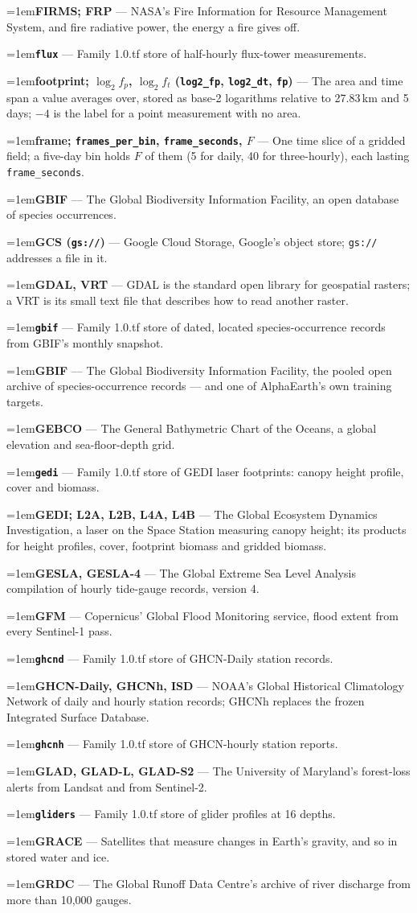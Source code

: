 \documentclass[10pt]{article}
\newcommand{\code}[1]{\texttt{#1}}
\newcommand{\gl}[2]{\par\hangindent=1em\hangafter=1\textbf{#1} --- #2\par}
\begin{document}
\gl{FIRMS; FRP}{NASA's Fire Information for Resource Management System, and fire radiative power, the energy a fire gives off.}
\gl{\code{flux}}{Family 1.0.tf store of half-hourly flux-tower measurements.}
\gl{footprint; $\log_2 f_p$, $\log_2 f_t$ (\code{log2\_fp}, \code{log2\_dt}, \code{fp})}{The area and time span a value averages over, stored as base-2 logarithms relative to 27.83\,km and 5 days; $-4$ is the label for a point measurement with no area.}
\gl{frame; \code{frames\_per\_bin}, \code{frame\_seconds}, $F$}{One time slice of a gridded field; a five-day bin holds $F$ of them (5 for daily, 40 for three-hourly), each lasting \code{frame\_seconds}.}
\gl{GBIF}{The Global Biodiversity Information Facility, an open database of species occurrences.}
\gl{GCS (\code{gs://})}{Google Cloud Storage, Google's object store; \code{gs://} addresses a file in it.}
\gl{GDAL, VRT}{GDAL is the standard open library for geospatial rasters; a VRT is its small text file that describes how to read another raster.}
\gl{\code{gbif}}{Family 1.0.tf store of dated, located species-occurrence records from GBIF's monthly snapshot.}
\gl{GBIF}{The Global Biodiversity Information Facility, the pooled open archive of species-occurrence records --- and one of AlphaEarth's own training targets.}
\gl{GEBCO}{The General Bathymetric Chart of the Oceans, a global elevation and sea-floor-depth grid.}
\gl{\code{gedi}}{Family 1.0.tf store of GEDI laser footprints: canopy height profile, cover and biomass.}
\gl{GEDI; L2A, L2B, L4A, L4B}{The Global Ecosystem Dynamics Investigation, a laser on the Space Station measuring canopy height; its products for height profiles, cover, footprint biomass and gridded biomass.}
\gl{GESLA, GESLA-4}{The Global Extreme Sea Level Analysis compilation of hourly tide-gauge records, version 4.}
\gl{GFM}{Copernicus' Global Flood Monitoring service, flood extent from every Sentinel-1 pass.}
\gl{\code{ghcnd}}{Family 1.0.tf store of GHCN-Daily station records.}
\gl{GHCN-Daily, GHCNh, ISD}{NOAA's Global Historical Climatology Network of daily and hourly station records; GHCNh replaces the frozen Integrated Surface Database.}
\gl{\code{ghcnh}}{Family 1.0.tf store of GHCN-hourly station reports.}
\gl{GLAD, GLAD-L, GLAD-S2}{The University of Maryland's forest-loss alerts from Landsat and from Sentinel-2.}
\gl{\code{gliders}}{Family 1.0.tf store of glider profiles at 16 depths.}
\gl{GRACE}{Satellites that measure changes in Earth's gravity, and so in stored water and ice.}
\gl{GRDC}{The Global Runoff Data Centre's archive of river discharge from more than 10,000 gauges.}
\end{document}
